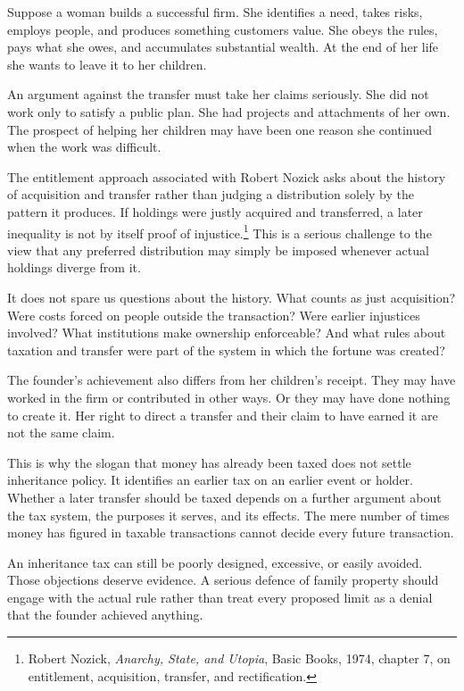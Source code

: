 \documentclass[12pt,a4paper]{book}
\begin{document}
Suppose a woman builds a successful firm. She identifies a need, takes risks, employs people, and produces something customers value. She obeys the rules, pays what she owes, and accumulates substantial wealth. At the end of her life she wants to leave it to her children.

An argument against the transfer must take her claims seriously. She did not work only to satisfy a public plan. She had projects and attachments of her own. The prospect of helping her children may have been one reason she continued when the work was difficult.

The entitlement approach associated with Robert Nozick asks about the history of acquisition and transfer rather than judging a distribution solely by the pattern it produces. If holdings were justly acquired and transferred, a later inequality is not by itself proof of injustice.\footnote{Robert Nozick, \emph{Anarchy, State, and Utopia}, Basic Books, 1974, chapter 7, on entitlement, acquisition, transfer, and rectification.} This is a serious challenge to the view that any preferred distribution may simply be imposed whenever actual holdings diverge from it.

It does not spare us questions about the history. What counts as just acquisition? Were costs forced on people outside the transaction? Were earlier injustices involved? What institutions make ownership enforceable? And what rules about taxation and transfer were part of the system in which the fortune was created?

The founder's achievement also differs from her children's receipt. They may have worked in the firm or contributed in other ways. Or they may have done nothing to create it. Her right to direct a transfer and their claim to have earned it are not the same claim.

This is why the slogan that money has already been taxed does not settle inheritance policy. It identifies an earlier tax on an earlier event or holder. Whether a later transfer should be taxed depends on a further argument about the tax system, the purposes it serves, and its effects. The mere number of times money has figured in taxable transactions cannot decide every future transaction.

An inheritance tax can still be poorly designed, excessive, or easily avoided. Those objections deserve evidence. A serious defence of family property should engage with the actual rule rather than treat every proposed limit as a denial that the founder achieved anything.
\end{document}
